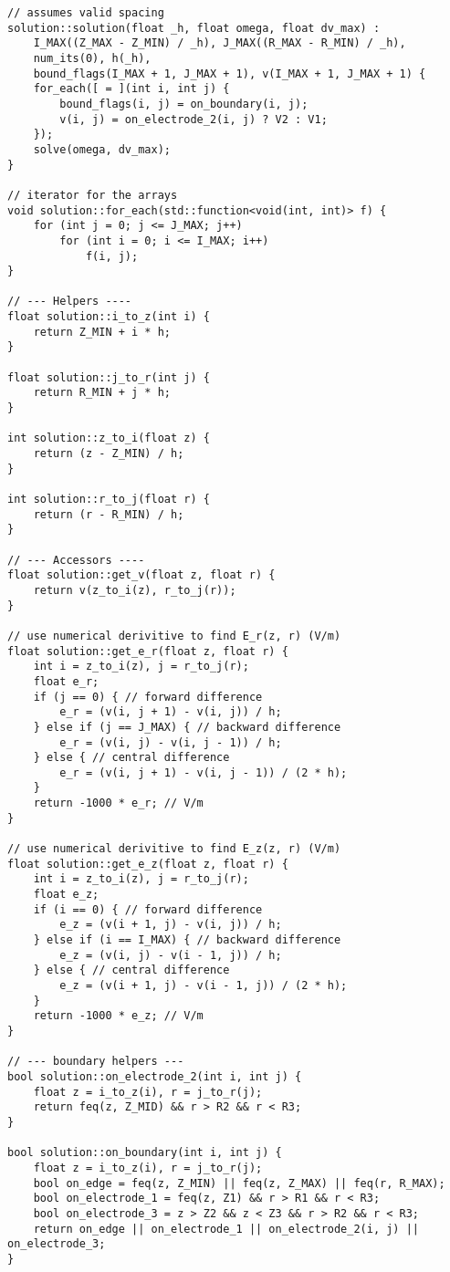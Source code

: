 \documentclass[12pt]{article}
\begin{document}
\begin{lstlisting}
// assumes valid spacing
solution::solution(float _h, float omega, float dv_max) :
    I_MAX((Z_MAX - Z_MIN) / _h), J_MAX((R_MAX - R_MIN) / _h),
    num_its(0), h(_h),
    bound_flags(I_MAX + 1, J_MAX + 1), v(I_MAX + 1, J_MAX + 1) {
    for_each([ = ](int i, int j) {
        bound_flags(i, j) = on_boundary(i, j);
        v(i, j) = on_electrode_2(i, j) ? V2 : V1;
    });
    solve(omega, dv_max);
}

// iterator for the arrays
void solution::for_each(std::function<void(int, int)> f) {
    for (int j = 0; j <= J_MAX; j++)
        for (int i = 0; i <= I_MAX; i++)
            f(i, j);
}

// --- Helpers ----
float solution::i_to_z(int i) {
    return Z_MIN + i * h;
}

float solution::j_to_r(int j) {
    return R_MIN + j * h;
}

int solution::z_to_i(float z) {
    return (z - Z_MIN) / h;
}

int solution::r_to_j(float r) {
    return (r - R_MIN) / h;
}

// --- Accessors ----
float solution::get_v(float z, float r) {
    return v(z_to_i(z), r_to_j(r));
}

// use numerical derivitive to find E_r(z, r) (V/m)
float solution::get_e_r(float z, float r) {
    int i = z_to_i(z), j = r_to_j(r);
    float e_r;
    if (j == 0) { // forward difference
        e_r = (v(i, j + 1) - v(i, j)) / h;
    } else if (j == J_MAX) { // backward difference
        e_r = (v(i, j) - v(i, j - 1)) / h;
    } else { // central difference
        e_r = (v(i, j + 1) - v(i, j - 1)) / (2 * h);
    }
    return -1000 * e_r; // V/m
}

// use numerical derivitive to find E_z(z, r) (V/m)
float solution::get_e_z(float z, float r) {
    int i = z_to_i(z), j = r_to_j(r);
    float e_z;
    if (i == 0) { // forward difference
        e_z = (v(i + 1, j) - v(i, j)) / h;
    } else if (i == I_MAX) { // backward difference
        e_z = (v(i, j) - v(i - 1, j)) / h;
    } else { // central difference
        e_z = (v(i + 1, j) - v(i - 1, j)) / (2 * h);
    }
    return -1000 * e_z; // V/m
}

// --- boundary helpers ---
bool solution::on_electrode_2(int i, int j) {
    float z = i_to_z(i), r = j_to_r(j);
    return feq(z, Z_MID) && r > R2 && r < R3;
}

bool solution::on_boundary(int i, int j) {
    float z = i_to_z(i), r = j_to_r(j);
    bool on_edge = feq(z, Z_MIN) || feq(z, Z_MAX) || feq(r, R_MAX);
    bool on_electrode_1 = feq(z, Z1) && r > R1 && r < R3;
    bool on_electrode_3 = z > Z2 && z < Z3 && r > R2 && r < R3;
    return on_edge || on_electrode_1 || on_electrode_2(i, j) || on_electrode_3;
}


\end{lstlisting}
\end{document}
